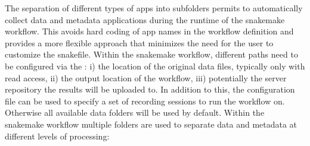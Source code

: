The separation of different types of apps into subfolders permits to automatically collect data and metadata applications during the runtime of the snakemake workflow. This avoids hard coding of app names in the workflow definition and provides a more flexible approach that minimizes the need for the user to customize the snakefile.
Within the snakemake workflow, different paths need to be configured via the : i) the location of the original data files, typically only with read access, ii) the output location of the workflow, iii) potentially the server repository the results will be uploaded to. In addition to this, the configuration file can be used to specify a set of recording sessions to run the workflow on. Otherwise all available data folders will be used by default.
Within the snakemake workflow multiple folders are used to separate data and metadata at different levels of processing:\\

\begin{minipage}[t]{\textwidth}
\ \\
\end{minipage}



\paragraph{}

